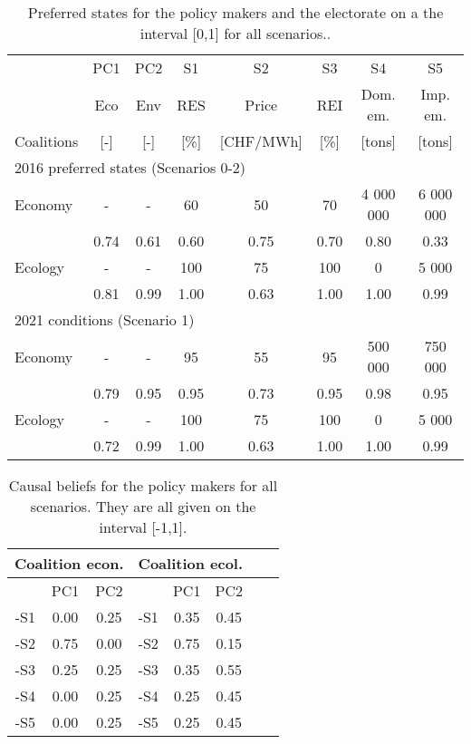 \documentclass[12pt]{article}
\begin{document}
\begin{table}
\begin{center}
\begin{tabular}{|l|c|c|c|c|c|c|c|} 
\hline
			& PC1 	& PC2	& S1		& S2			& S3		& S4			& S5			\\ 
			&Eco	& Env	& RES	& Price		& REI	& Dom. em.	& Imp. em.	\\
Coalitions		& [-]		& [-]		& [\%]	& [CHF/MWh]	& [\%]	& [tons]		& [tons]		\\ \hline
\multicolumn{8}{|l|}{2016 preferred states (Scenarios 0-2)}										\\ \hline
Economy		& -		& -		& 60		& 50 			& 70		& 4 000 000	& 6 000 000 	\\ \hline
			& 0.74	& 0.61	& 0.60	& 0.75 		& 0.70	& 0.80		& 0.33 		\\ \hline
Ecology 		& -		& -		& 100	& 75			& 100	& 0			& 5 000		\\ \hline
			& 0.81	& 0.99	& 1.00	& 0.63		& 1.00	& 1.00		& 0.99 		\\ \hline
\hline
\multicolumn{8}{|l|}{2021 conditions (Scenario 1)}											\\ \hline
Economy		& -		& -		& 95		& 55 			& 95		& 500 000		& 750 000		\\ \hline
			& 0.79	& 0.95	& 0.95	& 0.73		& 0.95 	& 0.98		& 0.95 		\\ \hline
Ecology		& -		& -		& 100	& 75			& 100	& 0			& 5 000		\\ \hline
			& 0.72	& 0.99	& 1.00	& 0.63		& 1.00	& 1.00		& 0.99 		\\ \hline
\end{tabular}
\end{center}
\caption{Preferred states for the policy makers and the electorate on a the interval [0,1] for all scenarios..}
\label{tab:si_elec_beliefs}
\end{table}

\begin{table}
\begin{center}
\begin{tabular}{ |c|c|c|c| |c|c|c|c|}
 \hline
\multicolumn{3}{|c|}{Coalition econ.}
					& \multicolumn{3}{|c|}{Coalition ecol.}	\\ \hline \hline
	& PC1	& PC2	&		& PC1	& PC2	\\ \hline
-S1 	& 0.00	& 0.25	& -S1 	& 0.35	& 0.45	\\ \hline
-S2 	& 0.75	& 0.00	& -S2 	& 0.75	& 0.15	\\ \hline
-S3 	& 0.25	& 0.25	& -S3 	& 0.35	& 0.55	\\ \hline
-S4 	& 0.00	& 0.25	& -S4 	& 0.25	& 0.45	\\ \hline
-S5 	& 0.00	& 0.25	& -S5 	& 0.25	& 0.45	\\
 \hline
\end{tabular}
\end{center}
\caption{Causal beliefs for the policy makers for all scenarios. They are all given on the interval [-1,1].}
\label{tab:si_elec_causalBeliefs}
\end{table}
\end{document}
